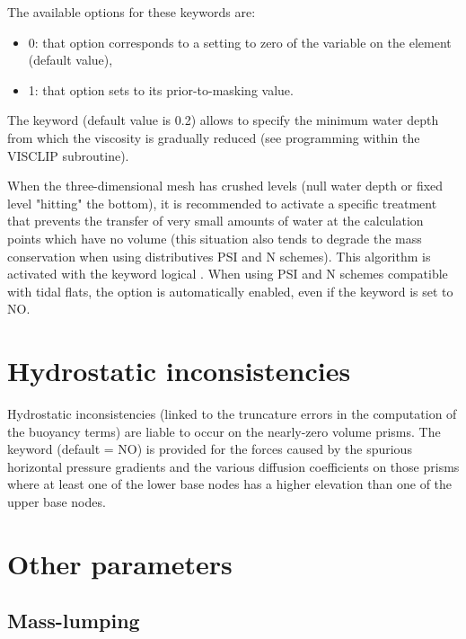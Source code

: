 The available options for these keywords are:

\begin{itemize}
\item 0: that option corresponds to a setting to zero of the variable on the
element (default value),

\item 1: that option sets to its prior-to-masking value.
\end{itemize}

The keyword  (default
value is 0.2) allows to specify the minimum water depth from which the
viscosity is gradually reduced (see programming within the VISCLIP subroutine).

When the three-dimensional mesh has crushed levels (null water depth or fixed
level "hitting" the bottom), it is recommended to activate a specific treatment
that prevents the transfer of very small amounts of water at the calculation
points which have no volume (this situation also tends to degrade the mass
conservation when using distributives PSI and N schemes). This algorithm is
activated with the keyword logical . When using PSI
and N schemes compatible with tidal flats, the option is automatically enabled,
even if the keyword is set to NO.

\section{Hydrostatic inconsistencies}

Hydrostatic inconsistencies (linked to the truncature errors in the computation
of the buoyancy terms) are liable to occur on the nearly-zero volume prisms.
The keyword  (default = NO) is
provided for the forces caused by the spurious horizontal pressure gradients
and the various diffusion coefficients on those prisms where at least one of
the lower base nodes has a higher elevation than one of the upper base nodes.

\section{Other parameters}

\subsection{Mass-lumping}

